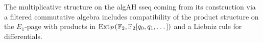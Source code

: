 \begin{rmk}
  The multiplicative structure on the algAH sseq coming from its construction via a filtered commutative algebra includes compatibility of the product structure on the $E_1$-page with products in $\operatorname{\mathrm{Ext}}_{\mathcal{P}}(\operatorname{\mathbb{F}}_2, \operatorname{\mathbb{F}}_2[q_0,q_1,\dots])$ and a Liebniz rule for differentials.
\end{rmk}

%


